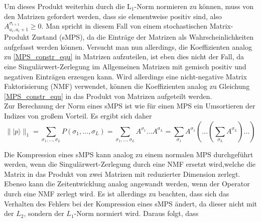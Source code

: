 \documentclass[10pt,a4paper]{report}
\newcommand{\SumIndex}{\sigma_1,\ldots,\sigma_L}
\begin{document}
Um dieses Produkt weiterhin durch die $\text{L}_1$-Norm normieren zu können, muss von den Matrizen gefordert werden, dass sie elementweise positiv sind, also $A_{a_i,a_i+1}^{\sigma_{i+1}}\geq 0$. Man spricht in diesem Fall von einem stochastischen Matrix-Produkt Zustand (sMPS), da die Einträge der Matrizen als Wahrscheinlichkeiten aufgefasst werden können.
Versucht man nun allerdings, die Koeffizienten analog zu \ref{MPS_constr_equ} in Matrizen aufzuteilen, ist eben dies nicht der Fall, da eine Singulärwert-Zerlegung im Allgemeinen Matrizen mit gemisch positiv und negativen Einträgen erzeugen kann. Wird allerdings eine nicht-negative Matrix Faktorisierung (NMF) verwendet, können die Koeffizienten analog zu Gleichung \ref{MPS_constr_equ} in das Produkt von Matrizen aufgeteilt werden.\\

Zur Berechnung der Norm eines sMPS ist wie für einen MPS ein Umsortieren der Indizes von großem Vorteil. Es ergibt sich daher
\begin{equation}
\parallel|p\rangle\parallel_1=\sum_{\SumIndex}P(\SumIndex)=\sum_{\SumIndex}A^{\sigma_1}\ldots A^{\sigma_L}=\sum_{\sigma_1}A^{\sigma_1}(\ldots(\sum_{\sigma_L}A^{\sigma_L})\ldots)
\end{equation}

Die Kompression eines sMPS kann analog zu einem normalen MPS durchgeführt werden, wenn die Singulärwert-Zerlegung durch eine NMF ersetzt wird,welche die Matrix in das Produkt von zwei Matrizen mit reduzierter Dimension zerlegt. Ebenso kann die Zeitentwicklung analog angewandt werden, wenn der Operator durch eine NMF zerlegt wird. Es ist allerdings zu beachten, dass sich das Verhalten des Fehlers bei der Kompression eines sMPS ändert, da dieser nicht mit der $L_2$, sondern der $L_1$-Norm normiert wird. Daraus folgt, dass 

\end{document}
